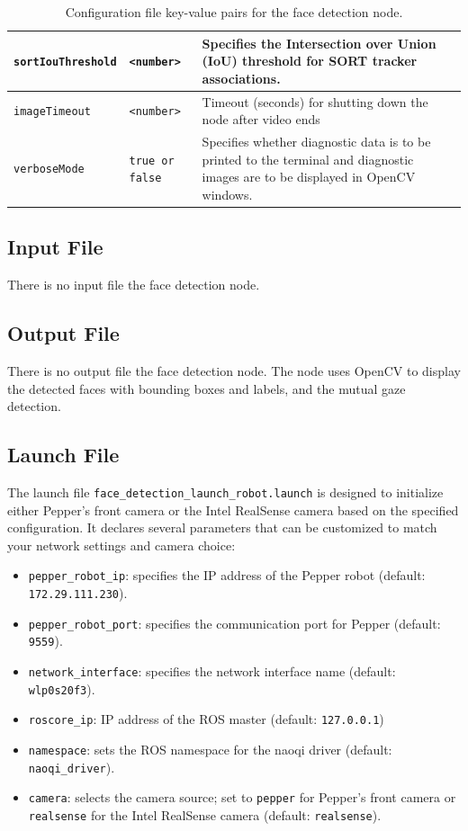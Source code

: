 \documentclass{CSSRforAfrica}
\begin{document}
{\begin{table}[h!]
\begin{tabularx}{\linewidth}{| l | l | X|}
		\hline
		{\footnotesize \texttt{sortIouThreshold}}       & {\footnotesize \texttt{<number>}}              & {\small Specifies the Intersection over Union (IoU) threshold for SORT tracker associations.} \\
		\hline
		{\footnotesize \texttt{imageTimeout}}           & {\footnotesize \texttt{<number>}}              & {\small Timeout (seconds) for shutting down the node after video ends} \\
		\hline
		{\footnotesize \texttt{verboseMode}}           & {\footnotesize \texttt{true or false}}         & {\small Specifies whether diagnostic data is to be printed to the terminal and diagnostic images are to be displayed in OpenCV windows.} \\
		\hline
	\end{tabularx}
	\caption{Configuration file key-value pairs for the face detection node.}
	\label{Table: configuration file for face detection node}
\end{table}


\subsection*{Input File}
There is no input file the face detection node.

\subsection*{Output File}
There is no output file the face detection node. The node uses OpenCV to display the detected faces with bounding boxes and labels, and the mutual gaze detection.

\subsection*{Launch File}
The launch file \texttt{face\_detection\_launch\_robot.launch} is designed to initialize either Pepper's front camera or the Intel RealSense camera based on the specified configuration. It declares several parameters that can be customized to match your network settings and camera choice:
\begin{itemize}
	\setlength\itemsep{0em}
	\item \texttt{pepper\_robot\_ip}: specifies the IP address of the Pepper robot (default: \texttt{172.29.111.230}).
	\item \texttt{pepper\_robot\_port}: specifies the communication port for Pepper (default: \texttt{9559}).
	\item \texttt{network\_interface}: specifies the network interface name (default: \texttt{wlp0s20f3}).
	\item \texttt{roscore\_ip}: IP address of the ROS master (default: \texttt{127.0.0.1})
	\item \texttt{namespace}: sets the ROS namespace for the naoqi driver (default: \texttt{naoqi\_driver}).
	\item \texttt{camera}: selects the camera source; set to \texttt{pepper} for Pepper's front camera or \texttt{realsense} for the Intel RealSense camera (default: \texttt{realsense}).
\end{itemize}

}
\end{document}
